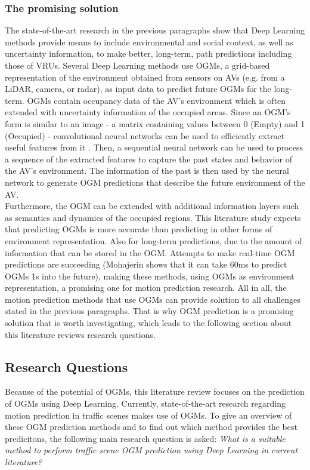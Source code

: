 \subsubsection{The promising solution}
The state-of-the-art research in the previous paragraphs show that Deep Learning methods provide means to include environmental and social context, as well as uncertainty information, to make better, long-term, path predictions including those of \glspl{VRU}. Several Deep Learning methods use \glspl{OGM}, a grid-based representation of the environment obtained from sensors on \glspl{AV} (e.g. from a LiDAR, camera, or radar), as input data to predict future \glspl{OGM} for the long-term. \glspl{OGM} contain occupancy data of the \gls{AV}'s environment which is often extended with uncertainty information of the occupied areas. 
Since an \gls{OGM}'s form is similar to an image - a matrix containing values between 0 (Empty) and 1 (Occupied) - convolutional neural networks can be used to efficiently extract useful features from it \cite{albawi2017understanding}. Then, a sequential neural network can be used to process a sequence of the extracted features to capture the past states and behavior of the \gls{AV}'s environment. The information of the past is then used by the neural network to generate \gls{OGM} predictions that describe the future environment of the \gls{AV}. \\
Furthermore, the \gls{OGM} can be extended with additional information layers such as semantics and dynamics of the occupied regions. This literature study expects that predicting \glspl{OGM} is more accurate than predicting in other forms of environment representation. Also for long-term predictions, due to the amount of information that can be stored in the \gls{OGM}. Attempts to make real-time \gls{OGM} predictions are succeeding (Mohajerin \cite{mohajerin2019multi} shows that it can take 60ms to predict \glspl{OGM} 1s into the future), making these methods, using \glspl{OGM} as environment representation, a promising one for motion prediction research. All in all, the motion prediction methods that use \glspl{OGM} can provide solution to all challenges stated in the previous paragraphs. That is why \gls{OGM} prediction is a promising solution that is worth investigating, which leads to the following section about this literature reviews research questions. \\

\subsection{Research Questions}
Because of the potential of \glspl{OGM}, this literature review focuses on the prediction of \glspl{OGM} using Deep Learning. Currently, state-of-the-art research regarding motion prediction in traffic scenes makes use of \glspl{OGM}. To give an overview of these \gls{OGM} prediction methods and to find out which method provides the best predicitons, the following main research question is asked: \textit{What is a suitable method to perform traffic scene \gls{OGM} prediction using Deep Learning in current literature?} \\

